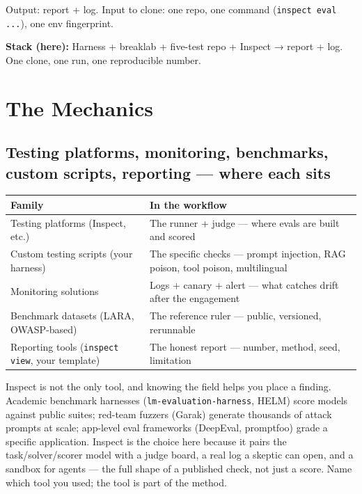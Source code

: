 Output: report + log. Input to clone: one repo, one command (\texttt{inspect eval ...}), one env fingerprint.

\begin{defbox}
\textbf{Stack (here):} Harness + breaklab + five-test repo + Inspect → report + log. One clone, one run, one reproducible number.
\end{defbox}

\section{The Mechanics}
\tierP

\subsection{Testing platforms, monitoring, benchmarks, custom scripts, reporting — where each sits}
\begin{center}
\begin{tabularx}{\linewidth}{lX}
\toprule
Family & In the workflow \\
\midrule
Testing platforms (Inspect, etc.) & The runner + judge — where evals are built and scored \\
Custom testing scripts (your harness) & The specific checks — prompt injection, RAG poison, tool poison, multilingual \\
Monitoring solutions & Logs + canary + alert — what catches drift after the engagement \\
Benchmark datasets (LARA, OWASP-based) & The reference ruler — public, versioned, rerunnable \\
Reporting tools (\texttt{inspect view}, your template) & The honest report — number, method, seed, limitation \\
\bottomrule
\end{tabularx}
\end{center}

Inspect is not the only tool, and knowing the field helps you place a finding. Academic benchmark harnesses (\texttt{lm-evaluation-harness}, HELM) score models against public suites; red-team fuzzers (Garak) generate thousands of attack prompts at scale; app-level eval frameworks (DeepEval, promptfoo) grade a specific application. Inspect is the choice here because it pairs the task/solver/scorer model with a judge board, a real log a skeptic can open, and a sandbox for agents — the full shape of a published check, not just a score. Name which tool you used; the tool is part of the method.

